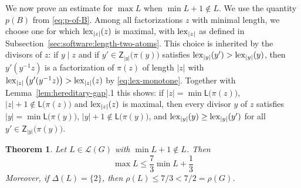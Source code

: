 \documentclass[a4paper, 10pt]{amsart}
\theoremstyle{plain}
\newtheorem{theorem}{\bf Theorem}[section]
\theoremstyle{definition}
\theoremstyle{definition}
\numberwithin{equation}{section}
\begin{document}
We now prove an estimate for $\max L$ when $\min L+1\not\in L$.  We use the quantity $p(B)$ from
\eqref{eq:p-of-B}.
Among all  factorizations $z$ with minimal length, we choose one for which
$\operatorname{lex}_{|z|} (z)$ is maximal, with $\operatorname{lex}_{|z|}$ as defined in
Subsection~\ref{sec:software:length-two-atoms}.  This choice is
inherited by the divisors of $z$:  if $y \mid z$ and if
$y' \in \mathsf Z_{|y|} \big(\pi (y) \big)$ satisfies $\operatorname{lex}_{|y|} (y') > \operatorname{lex}_{|y|} (y)$,
then $y'(y^{-1}z)$ is a factorization of $\pi (z)$ of length $|z|$ with
$\operatorname{lex}_{|z|} \big(y'(y^{-1}z) \big) > \operatorname{lex}_{|z|} (z)$ by \eqref{eq:lex-monotone}.  Together with Lemma~\ref{lem:hereditary-gap}.1 this
shows:  if $|z| = \min \mathsf L \big(\pi (z) \big)$, $|z|+1 \notin \mathsf L \big(\pi (z) \big)$
and $\operatorname{lex}_{|z|} (z)$ is maximal, then every divisor $y$ of $z$ satisfies
$|y| = \min \mathsf L \big(\pi (y) \big)$, $|y|+1 \notin \mathsf L \big(\pi (y) \big)$, and
$\operatorname{lex}_{|y|} (y) \ge \operatorname{lex}_{|y|} (y')$ for all $y' \in \mathsf Z_{|y|} \big(\pi (y) \big)$.

\begin{theorem} \label{thm:lower-gap-endpoint}
Let $L \in\mathcal L (G)$ with $\min L  +1\notin  L$.  Then
\begin{equation}
\max  L  \le \frac{7}{3}\min L  + \frac{1}{3}                                            \label{eq:lower-gap-bound}
\end{equation}
Moreover, if $\Delta (L) = \{2\}$, then $\rho (L) \le 7/3 < 7/2 = \rho (G)$.
\end{theorem}
\end{document}
